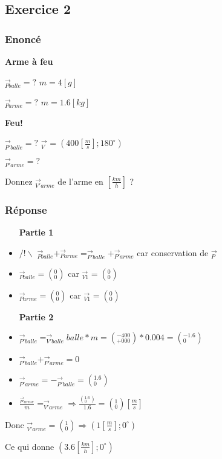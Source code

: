 \subsection{Exercice 2}
\subsubsection{Enoncé}
\textbf{Arme à feu}

$_{Pballe}^{\rightarrow} = ?$ 
$m=4[g]$

$_{Parme}^{\rightarrow} = ?$ 
$m=1.6[kg]$

\textbf{Feu!} 

$_{P'balle}^{\rightarrow} = ? $ 
$_{V}^{\rightarrow} = (400[\frac{m}{s}];180^\circ)$

$_{P'arme}^{\rightarrow} = ?$ 


Donnez $_{V'arme}^{\rightarrow}$ de l'arme en $[\frac{km}{h}]$ ?

\subsubsection{Réponse}

\begin{itemize}
   \item[\textbf{Partie 1}]
   \item \underline{$/!\backslash$} $_{Pballe}^{\rightarrow} + _{Parme}^{\rightarrow} = _{P'balle}^{\rightarrow} + _{P'arme}^{\rightarrow}$ car conservation de $_P^\rightarrow$
   \item $_{Pballe}^{\rightarrow} = (_{0}^{0}) $ car $_{V1}^{\rightarrow} = (_{0}^{0})$ 
   \item $_{Parme}^{\rightarrow} = (_{0}^{0}) $ car $_{V1}^{\rightarrow} = (_{0}^{0})$ 
   \item[\textbf{Partie 2}]
   \item $_{P'balle}^{\rightarrow} = _{V'balle}^{\rightarrow}balle * m = (_{+000}^{-400}) * 0.004 = (_0^{-1.6})$
   \item $_{P'balle}^{\rightarrow} + _{P'arme}^{\rightarrow} = 0$
   \item $_{P'arme}^{\rightarrow} = - _{P'balle}^{\rightarrow} = (_0^{1.6})$
   \item $ \frac{_{P'arme}^{\rightarrow}}{m} = _{V'arme}^{\rightarrow} \Rightarrow  \frac{(_0^{1.6})}{1.6} = (_{0}^{1}) [\frac{m}{s}]$
\end{itemize}


Donc $_{V'arme}^{\rightarrow} = (_{0}^{1}) \Rightarrow (1[\frac{m}{s}];0^{\circ})$ 

Ce qui donne $(3.6[\frac{km}{h}];0^{\circ})$ 
